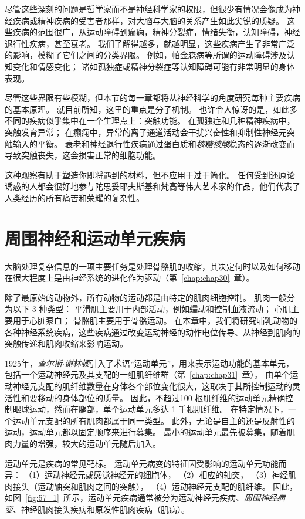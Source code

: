 尽管这些深刻的问题是哲学家而不是神经科学家的权限，但很少有情况会像成为神经疾病或精神疾病的受害者那样，对大脑与大脑的关系产生如此尖锐的质疑。
这些疾病的范围很广，从运动障碍到癫痫，精神分裂症，情绪失衡，认知障碍，神经退行性疾病，甚至衰老。
我们了解得越多，就越明显，这些疾病产生了非常广泛的影响，模糊了它们之间的分类界限。
例如，帕金森病等所谓的运动障碍涉及认知变化和情感变化；
诸如孤独症或精神分裂症等认知障碍可能有非常明显的身体表现。


尽管这些界限有些模糊，但本节的每一章都将从神经科学的角度研究每种主要疾病的基本原理。
就目前所知，这里的重点是分子机制。
也许令人惊讶的是，如此多不同的疾病似乎集中在一个生理点上：突触功能。
在孤独症和几种精神疾病中，突触发育异常；
在癫痫中，异常的离子通道活动会干扰兴奋性和抑制性神经元突触输入的平衡。
衰老和神经退行性疾病通过蛋白质和\textit{核糖核酸}稳态的逐渐改变而导致突触丧失，这会损害正常的细胞功能。


这种观察有助于塑造你即将遇到的材料，但不应用于过于简化。
任何受到还原论诱惑的人都会很好地参与陀思妥耶夫斯基和梵高等伟大艺术家的作品，他们代表了人类经历的所有痛苦和荣耀的复杂性。




\chapter{周围神经和运动单元疾病} \label{chap:chap57}

大脑处理复杂信息的一项主要任务是处理骨骼肌的收缩，其决定何时以及如何移动在很大程度上是由神经系统的进化作为驱动（第~\ref{chap:chap30}~章）。


除了最原始的动物外，所有动物的运动都是由特定的肌肉细胞控制。
肌肉一般分为以下 3 种类型：
平滑肌主要用于内部活动，例如蠕动和控制血液流动；
心肌主要用于心脏泵血；
骨骼肌主要用于骨骼运动。
在本章中，我们将研究哺乳动物的各种神经系统疾病，这些疾病通过改变运动神经的动作电位传导、从神经到肌肉的突触传递和肌肉收缩来影响运动。


1925年，\textit{查尔斯$\cdot$谢林顿}引入了术语“运动单元”，用来表示运动功能的基本单元，包括一个运动神经元及其支配的一组肌纤维群（第~\ref{chap:chap31}~章）。
由单个运动神经元支配的肌纤维数量在身体各个部位变化很大，这取决于其所控制运动的灵活性和要移动的身体部位的质量。
因此，不超过100 根肌纤维的运动单元精确控制眼球运动，然而在腿部，单个运动单元多达 1 千根肌纤维。
在特定情况下，一个运动单元支配的所有肌肉都属于同一类型。
此外，无论是自主的还是反射性的运动，运动单元都以固定顺序来进行募集。
最小的运动单元最先被募集，随着肌肉力量的增强，较大的运动单元随后加入。


运动单元是疾病的常见靶标。
运动单元病变的特征因受影响的运动单元功能而异：
（1）运动神经元或感觉神经元的细胞体，
（2）相应的轴突，
（3）神经肌肉接头（运动轴突和肌肉之间的突触），
（4）运动神经元支配的肌纤维。
因此，如图~\ref{fig:57_1}~所示，运动单元疾病通常被分为运动神经元疾病、\textit{周围神经病变}、神经肌肉接头疾病和原发性肌肉疾病（肌病）。


